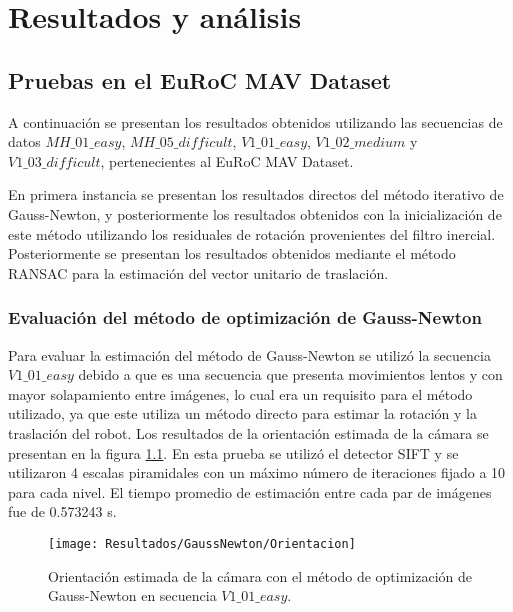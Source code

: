 \chapter{Resultados y análisis}
\label{capitulo6}

\section{Pruebas en el EuRoC MAV Dataset}
A continuación se presentan los resultados obtenidos
utilizando las secuencias de datos  $MH\_ 01\_ easy$,  $MH\_ 05\_ difficult$,  $V1\_ 01\_ easy$,
$V1\_ 02\_ medium$ y  $V1\_ 03\_ difficult$, pertenecientes al EuRoC MAV Dataset.

En primera instancia se presentan los resultados directos del método iterativo de Gauss-Newton, y posteriormente los resultados obtenidos con la inicialización de este método utilizando los residuales de rotación provenientes del filtro inercial. Posteriormente se presentan los resultados obtenidos mediante el método RANSAC para la estimación del vector unitario de traslación.


\subsection{Evaluación del método de optimización de Gauss-Newton }

Para evaluar la estimación del método de Gauss-Newton se utilizó la secuencia $V1\_ 01\_ easy$ debido a que es una secuencia que presenta movimientos lentos y con mayor solapamiento entre imágenes, lo cual era un requisito para el método utilizado, ya que este utiliza un método directo para estimar la rotación y la traslación del robot. Los resultados de la orientación estimada de la cámara se presentan en la figura \ref{imagen:Resultados/GaussNewton/Orientacion}. En esta prueba se utilizó el detector SIFT y se utilizaron 4 escalas piramidales con un máximo número de iteraciones fijado a 10 para cada nivel. El tiempo promedio de estimación entre cada par de imágenes fue de 0.573243 s.

\begin{figure}[H]
	\centering
	\texttt{[image: Resultados/GaussNewton/Orientacion]}
	\caption{Orientación estimada de la cámara con el método de optimización de Gauss-Newton en secuencia $V1\_ 01\_ easy$. }
	\label{imagen:Resultados/GaussNewton/Orientacion}
\end{figure}

